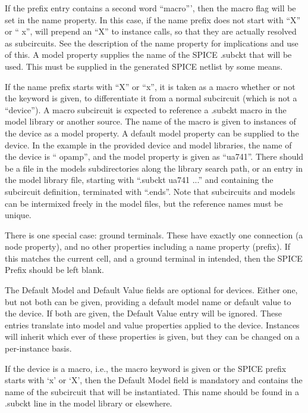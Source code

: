 If the prefix entry contains a second word ``{\vt macro}''', then the
{\vt macro} flag will be set in the {\et name} property.  In this
case, if the name prefix does not start with ``{\vt X}'' or ``{\vt
x}'', {\Xic} will prepend an ``{\vt X}'' to instance calls, so that
they are actually resolved as subcircuits.  See the description of the
name property for implications and use of this.  A {\et model}
property supplies the name of the SPICE {\vt .subckt} that will be
used.  This must be supplied in the generated SPICE netlist by some
means.

If the name prefix starts with ``{\vt X}'' or ``{\vt x}'', it is taken
as a macro whether or not the keyword is given, to differentiate it
from a normal subcircuit (which is not a ``device'').  A macro
subcircuit is expected to reference a {\vt .subckt} macro in the model
library or another source.  The name of the macro is given to
instances of the device as a {\et model} property.  A default model
property can be supplied to the device.  In the example in the
provided device and model libraries, the name of the device is ``{\vt
opamp}'', and the {\et model} property is given as ``{\vt ua741}''. 
There should be a file in the models subdirectories along the library
search path, or an entry in the model library file, starting with
``{\vt .subckt ua741} ...'' and containing the subcircuit definition,
terminated with ``{\vt .ends}''.  Note that subcircuits and models can
be intermixed freely in the model files, but the reference names must
be unique.

There is one special case:  ground terminals.  These have exactly one
connection (a {\et node} property), and no other properties including
a {\et name} property (prefix).  If this matches the current cell, and
a ground terminal in intended, then the {\cb SPICE Prefix} should be
left blank.

The {\cb Default Model} and {\cb Default Value} fields are optional
for devices.  Either one, but not both can be given, providing a
default model name or default value to the device.  If both are given,
the {\cb Default Value} entry will be ignored.  These entries
translate into {\et model} and {\et value} properties applied to the
device.  Instances will inherit which ever of these properties is
given, but they can be changed on a per-instance basis.

If the device is a macro, i.e., the {\vt macro} keyword is given or
the SPICE prefix starts with `{\vt x}' or `{\vt X}', then the {\cb
Default Model} field is mandatory and contains the name of the
subcircuit that will be instantiated.  This name should be found in a
{\vt .subckt} line in the model library or elsewhere.

